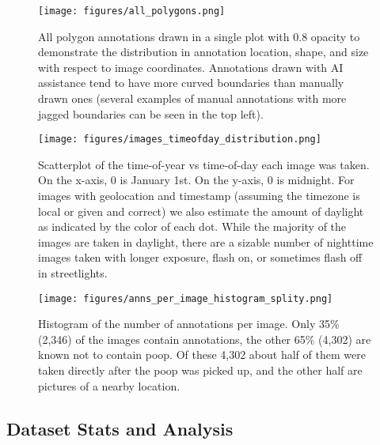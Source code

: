 \documentclass[10pt,twocolumn,letterpaper]{article}
\begin{document}

\begin{figure}[ht]
\centering
\texttt{[image: figures/all\_polygons.png]}
\caption[]{
    All polygon annotations drawn in a single plot with 0.8 opacity to
    demonstrate the distribution in annotation location, shape, and size with
    respect to image coordinates. Annotations drawn with AI
    assistance tend to have more curved boundaries than manually drawn ones
    (several examples of manual annotations with more jagged boundaries can be
    seen in the top left).
}
\label{fig:AllPolygons}
\end{figure}

\begin{figure}[ht]
\centering
\texttt{[image: figures/images\_timeofday\_distribution.png]}
\caption[]{
    Scatterplot of the time-of-year vs time-of-day each image was taken.
    On the x-axis, 0 is January 1st.
    On the y-axis, 0 is midnight.
    For images with geolocation and timestamp (assuming the timezone is local or given and correct) we also
      estimate the amount of daylight as indicated by the color of each dot.
    While the majority of the images are taken in daylight, there are a sizable number of nighttime images taken with longer exposure, flash on, or sometimes flash off in streetlights.
}
\label{fig:TimeOfDayDistribution}
\end{figure}


\begin{figure}[ht]
\centering
\texttt{[image: figures/anns\_per\_image\_histogram\_splity.png]}
\caption[]{
    Histogram of the number of annotations per image. 
    Only 35\% (2,346) of the images contain annotations, the other 65\% (4,302)
    are known not to contain poop. Of these 4,302 about half of them were taken
    directly after the poop was picked up, and the other half are pictures of a
    nearby location.
}
\label{fig:AnnotsPerImage}
\end{figure}


\subsection{Dataset Stats and Analysis}
\end{document}
